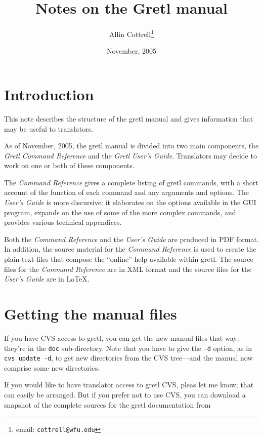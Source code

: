 \documentclass{article}
\begin{document}
\title{Notes on the Gretl manual}
\author{Allin Cottrell\thanks{email: \texttt{cottrell@wfu.edu}}}
\date{November, 2005}

\maketitle

\setcounter{tocdepth}{1}
\tableofcontents

\section{Introduction}

This note describes the structure of the \textsf{gretl} manual and
gives information that may be useful to translators.

As of November, 2005, the gretl manual is divided into two main
components, the \textit{Gretl Command Reference} and the \textit{Gretl
  User's Guide}.  Translators may decide to work on one or both of
these components.

The \textit{Command Reference} gives a complete listing of
\textsf{gretl} commands, with a short account of the function of each
command and any arguments and options.  The \textit{User's Guide} is
more discursive: it elaborates on the options available in the GUI
program, expands on the use of some of the more complex commands, and
provides various technical appendices.

Both the \textit{Command Reference} and the \textit{User's Guide} are
produced in PDF format.  In addition, the source material for the
\textit{Command Reference} is used to create the plain text files that
compose the ``online'' help available within \textsf{gretl}.  The
source files for the \textit{Command Reference} are in XML format and
the source files for the \textit{User's Guide} are in \LaTeX.

\section{Getting the manual files}
\label{getit}

If you have CVS access to gretl, you can get the new manual files that
way: they're in the \texttt{doc} sub-directory.  Note that you have to
give the \texttt{-d} option, as in \texttt{cvs update -d}, to get new
directories from the CVS tree---and the manual now comprise some new
directories.

If you would like to have translator access to \textsf{gretl} CVS,
pleas let me know; that can easily be arranged.  But if you prefer not
to use CVS, you can download a snapshot of the complete sources for
the \textsf{gretl} documentation from
\end{document}
